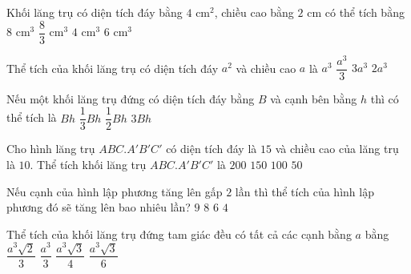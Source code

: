 \begin{ex}%
	Khối lăng trụ có diện tích đáy bằng $4$ $\mathrm{cm}^2$, chiều cao bằng $2$ $\mathrm{cm}$ có thể tích bằng
	\choice
	{ \True $8$ $ \mathrm{cm}^3$}
	{ $\dfrac{8}{3}$ $ \mathrm{cm}^3$}
	{ $4$ $ \mathrm{cm}^3$}
	{ $6$ $ \mathrm{cm}^3$}
\end{ex}

\begin{ex}%
	Thể tích của khối lăng trụ có diện tích đáy $a^2$ và chiều cao $a$ là
	\choice
	{ \True $a^3$}
	{ $\dfrac{a^3}{3}$}
	{ $3a^3$}
	{ $2a^3$}
\end{ex}

\begin{ex}%
	Nếu một khối lăng trụ đứng có diện tích đáy bằng $B$ và cạnh bên bằng $h$ thì có thể tích là
	\choice
	{ \True $Bh$}
	{ $\dfrac{1}{3}Bh$}
	{ $\dfrac{1}{2}Bh$}
	{ $3Bh$}
\end{ex}

\begin{ex}%
	Cho hình lăng trụ $ABC.A'B'C'$ có diện tích đáy là $15$ và chiều cao của lăng trụ là $10$. Thể tích khối lăng trụ $ABC.A'B'C'$ là
	\choice
	{ $200$}
	{ \True $150$}
	{ $100$}
	{ $50$}
\end{ex}

\begin{ex}%
	Nếu cạnh của hình lập phương tăng lên gấp $2$ lần thì thể tích của hình lập phương đó sẽ tăng lên bao nhiêu lần?
	\choice
	{ $9$}
	{ \True $8$}
	{ $6$}
	{ $4$}
\end{ex}

\begin{ex}%
	Thể tích của khối lăng trụ đứng tam giác đều có tất cả các cạnh bằng $a$ bằng
	\choice
	{$\dfrac{a^3\sqrt{2}}{3}$}
	{$\dfrac{a^3}{3}$}
	{\True $\dfrac{a^3\sqrt{3}}{4}$}
	{$\dfrac{a^3\sqrt{3}}{6}$}
\end{ex}

